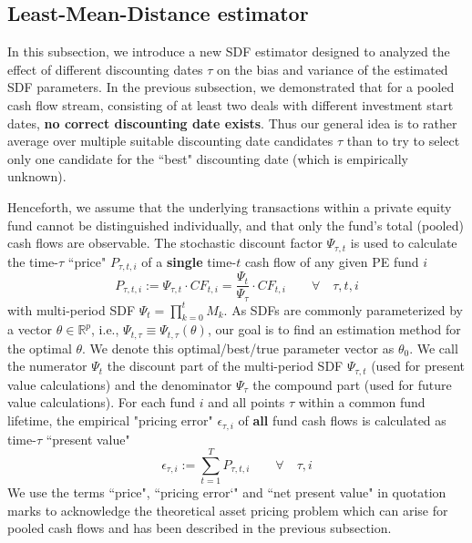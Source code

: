 \documentclass[12pt]{article}
\begin{document}
\subsection{Least-Mean-Distance estimator}
\label{sec:fundwise_lmd_estimator}

In this subsection, we introduce a new SDF estimator designed to analyzed the effect of different discounting dates $\tau$ on the bias and variance of the estimated SDF parameters.
In the previous subsection, we demonstrated that for a pooled cash flow stream, consisting of at least two deals with different investment start dates, \textbf{no correct discounting date exists}.
Thus our general idea is to rather average over multiple suitable discounting date candidates $\tau$ than to try to select only one candidate for the ``best" discounting date (which is empirically unknown).

Henceforth, we assume that the underlying transactions within a private equity fund cannot be distinguished individually, and that only the fund’s total (pooled) cash flows are observable.
The stochastic discount factor $\Psi_{\tau,t}$ is used to calculate the time-$\tau$ ``price" $P_{\tau,t,i}$ of a \textbf{single} time-$t$ cash flow of any given PE fund $i$
\begin{equation}
\label{eq:price}
P_{\tau,t,i} := \Psi_{\tau,t} \cdot CF_{t,i}
= \frac{\Psi_{t}}{\Psi_{\tau}} \cdot CF_{t,i}
\qquad \forall \quad \tau,t,i
\end{equation}
with multi-period SDF $\Psi_t = \prod_{k=0}^t M_k$.
As SDFs are commonly parameterized by a vector $\theta \in \mathbb{R}^{p}$, i.e., $\Psi_{t,\tau} \equiv \Psi_{t,\tau} (\theta)$, our goal is to find an estimation method for the optimal $\theta$.
We denote this optimal/best/true parameter vector as $\theta_0$.
We call the numerator $\Psi_{t}$ the discount part of the multi-period SDF $\Psi_{\tau,t}$ (used for present value calculations) and the denominator $\Psi_{\tau}$ the compound part (used for future value calculations).
For each fund $i$ and all points $\tau$ within a common fund lifetime, the empirical "pricing error" $\epsilon_{\tau,i}$ of \textbf{all} fund cash flows is calculated as time-$\tau$ ``present value"
\begin{equation}
\label{eq:pricing_error}
\epsilon_{\tau,i} := \sum_{t=1}^T P_{\tau,t,i} 
\qquad \forall \quad \tau,i
\end{equation}
We use the terms ``price", ``pricing error`" and ``net present value" in quotation marks to acknowledge the theoretical asset pricing problem which can arise for pooled cash flows and has been described in the previous subsection.
\end{document}
